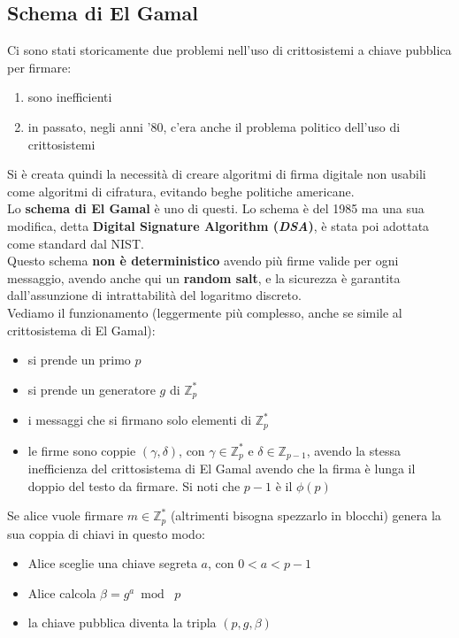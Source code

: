 \documentclass[a4paper,12pt, oneside]{book}
\begin{document}
\subsection{Schema di El Gamal}
Ci sono stati storicamente due problemi nell'uso di crittosistemi a chiave
pubblica per firmare: 
\begin{enumerate}
  \item sono inefficienti
  \item in passato, negli anni '80, c'era anche il problema politico dell'uso di
  crittosistemi 
\end{enumerate}
Si è creata quindi la necessità di creare algoritmi di firma digitale non
usabili come algoritmi di cifratura, evitando beghe politiche americane.\\
Lo \textbf{schema di El Gamal} è uno di questi. Lo schema è del 1985 ma una sua
modifica, detta \textbf{Digital Signature Algorithm (\textit{DSA})}, è stata poi
adottata come standard dal NIST.\\
Questo schema \textbf{non è deterministico} avendo più firme valide per ogni
messaggio, avendo anche qui un \textbf{random salt}, e la sicurezza è garantita
dall'assunzione di intrattabilità del logaritmo discreto.\\
Vediamo il funzionamento (leggermente più complesso, anche se simile al
crittosistema di El Gamal):
\begin{itemize}
  \item si prende un primo $p$
  \item si prende un generatore $g$ di $\mathbb{Z}_p^*$
  \item i messaggi che si firmano solo elementi di $\mathbb{Z}_p^*$
  \item le firme sono coppie $(\gamma,\delta)$, con $\gamma \in\mathbb{Z}_p^*$ e
  $\delta\in\mathbb{Z}_{p-1}$, avendo la stessa inefficienza del crittosistema
  di El Gamal avendo che la firma è lunga il doppio del testo da firmare. Si
  noti che $p-1$ è il $\phi(p)$
\end{itemize}
Se alice vuole firmare $m\in\mathbb{Z}_p^*$ (altrimenti bisogna spezzarlo in
blocchi) genera la sua coppia di chiavi in questo modo:
\begin{itemize}
  \item Alice sceglie una chiave segreta $a$, con $0<a<p-1$
  \item Alice calcola $\beta=g^a\bmod\,\,p$
  \item la chiave pubblica diventa la tripla $(p,g,\beta)$
\end{itemize}
\end{document}

